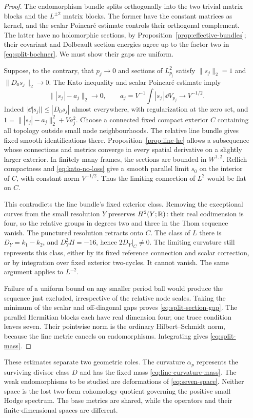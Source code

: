 \begin{proof}
The endomorphism bundle splits orthogonally into the two
trivial matrix blocks and the $L^{\pm2}$ matrix blocks.
The former have the constant matrices as kernel, and the
scalar Poincaré estimate controls their orthogonal complement.
The latter have no holomorphic sections, by
Proposition~\ref{prop:effective-bundles}; their covariant and
Dolbeault section energies agree up to the factor two in
\eqref{eq:split-bochner}. We must show their gaps are uniform.

Suppose, to the contrary, that $p_j\to0$ and sections of
$L_{p_j}^2$ satisfy
$\|s_j\|_2=1$ and $\|D_0s_j\|_2\to0$.
The Kato inequality and scalar Poincaré estimate imply
\begin{equation}\label{eq:kato-no-loss}
 \big\||s_j|-a_j\big\|_2\longrightarrow0,
 \qquad a_j=V^{-1}\int|s_j|\,\dd V_{p_j}
                         \longrightarrow V^{-1/2}.
\end{equation}
Indeed $|\dd|s_j||\le|D_0s_j|$ almost everywhere, with
regularization at the zero set, and
$1=\||s_j|-a_j\|_2^2+Va_j^2$.
Choose a connected fixed compact exterior $C$ containing
all topology outside small node neighbourhoods. The relative
line bundle gives fixed smooth identifications there.
Proposition~\ref{prop:line-he} allows a subsequence whose
connections and metrics converge in every spatial derivative
on a slightly larger exterior. In finitely many frames,
the sections are bounded in $W^{1,2}$. Rellich compactness
and \eqref{eq:kato-no-loss} give a smooth parallel limit
$s_0$ on the interior of $C$, with constant norm $V^{-1/2}$.
Thus the limiting connection of $L^2$ would be flat on $C$.

This contradicts the line bundle's fixed exterior class.
Removing the exceptional curves from the small resolution
$Y$ preserves $H^2(Y;\mathbb R)$: their real codimension is four,
so the relative groups in degrees two and three in the Thom
sequence vanish. The punctured resolution retracts onto $C$.
The class of $L$ there is $D_Y=k_1-k_2$, and
$D_Y^2H=-16$, hence $2D_Y|_C\ne0$. The limiting curvature
still represents this class, either by its fixed reference
connection and scalar correction, or by integration over
fixed exterior two-cycles. It cannot vanish.
The same argument applies to $L^{-2}$.

Failure of a uniform bound on any smaller period ball would
produce the sequence just excluded, irrespective of the
relative node scales. Taking the minimum of the scalar and
off-diagonal gaps proves \eqref{eq:split-section-gap}.
The parallel Hermitian blocks each have real dimension four;
one trace condition leaves seven. Their pointwise norm is
the ordinary Hilbert--Schmidt norm, because the line metric
cancels on endomorphisms. Integrating gives
\eqref{eq:split-mass}.
\end{proof}

These estimates separate two geometric roles. The curvature
$\alpha_p$ represents the surviving divisor class $D$ and
has the fixed mass \eqref{eq:line-curvature-mass}. The weak
endomorphisms to be studied are deformations of
\eqref{eq:seven-space}. Neither space is the lost two-form
cohomology quotient governing the positive small Hodge
spectrum. The base metrics are shared, while the operators
and their finite-dimensional spaces are different.
